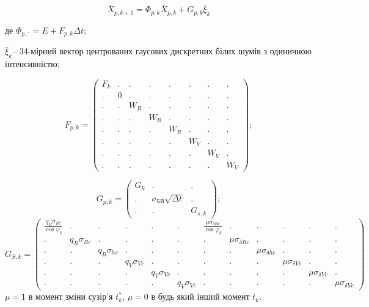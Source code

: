\begin{equation}
\label{eq:fullsystem}
\bar{X}_{p,k+1} =\Phi_{p,k} \bar{X}_{p,k} +G_{p,k} \bar{\xi }_{k}
\end{equation}
\begin{ESKDexplanation}
\item де $\Phi_{p,:} =E+F_{p,k} \Delta t;$
\item $\bar{\xi }_{k} $-- 34-мірний вектор центрованих гаусових дискретних білих шумів 
з одиничною інтенсивністю;
\end{ESKDexplanation}
\[ F_{p,k} =\left(\begin{array}{cccccccc} 
{F_{k} } & {.} & {.} & {.} & {.} & {.} & {.} & {.} \\ 
{.} & {0} & {.} & {.} & {.} & {.} & {.} & {.} \\ 
{.} & {.} & {W_{R}} & {.} & {.} & {.} & {.} & {.} \\ 
{.} & {.} & {.} & {W_{R} } & {.} & {.} & {.} & {.} \\ 
{.} & {.} & {.} & {.} & {W_{R} } & {.} & {.} & {.} \\ 
{.} & {.} & {.} & {.} & {.} & {W_{V} } & {.} & {.} \\ 
{.} & {.} & {.} & {.} & {.} & {.} & {W_{V} } & {.} \\ 
{.} & {.} & {.} & {.} & {.} & {.} & {.} & {W_{V} } 
\end{array}\right);\] 

\[G_{p,k} =\left(\begin{array}{ccc} 
{G_{k} } & {.} & {.} \\ 
{.} & {\sigma_{\text{БВ}} \sqrt{\Delta t}} & {.} \\ 
{.} & {.} & {G_{s,k} } \end{array}\right);\] 
\begin{equation*}
\scriptstyle
G_{S,k} = \left(\begin{array}{cccccccccccc} 
\scriptstyle{\frac{q_{R} \sigma_{Rc} }{\scriptstyle \cos \varphi_{k} } } & {.} & {.} & {.} & {.} & {.} & {\scriptstyle \frac{\mu \sigma_{\delta Rc} }{\cos \varphi_{k} } } & 
{.} & {.} & {.} & {.} & {.} \\ 
{.} & {\scriptstyle q_{R} \sigma_{Rc} } & {.} & {.} & {.} & {.} & {.} & {\scriptstyle \mu \sigma_{\delta Rc} } & {.} & {.} & {.} & {.} \\ 
{.} & {.} & {\scriptstyle q_{R} \sigma_{hc} } & {.} & {.} & {.} & {.} & {.} & {\scriptstyle \mu \sigma_{\delta hc} } & {.} & {.} & {.} \\ 
{.} & {.} & {.} & {\scriptstyle q_{V} \sigma_{Vc} } & {.} & {.} & {.} & {.} & {.} & {\scriptstyle \mu \sigma_{\delta Vc} } & {.} & {.} \\ 
{.} & {.} & {.} & {.} & {\scriptstyle q_{V} \sigma_{Vc} } & {.} & {.} & {.} & {.} & {.} & {\scriptstyle \mu \sigma_{\delta Vc} } & {.} \\ 
\scriptstyle{.} & {.} & {.} & {.} & {.} & {\scriptstyle q_{V} \sigma_{Vc} } & {.} & {.} & {.} & {.} & {.} & {\scriptstyle \mu \sigma_{\delta Vc} } \end{array}\right)
\end{equation*}
$\mu =1$ в момент зміни сузір'я $t_{k}^{*} $, $\mu =0$ в будь який інший момент $t_{k}^{} $.

